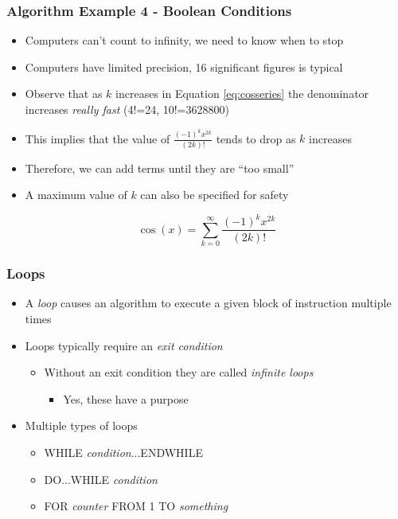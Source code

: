 \documentclass[14pt]{beamer}
\begin{document}
\begin{frame}
\frametitle{Algorithm Example 4 - Boolean Conditions}
{\small
\begin{itemize}
\setlength{\itemsep}{1pt}
  \setlength{\parskip}{0pt}
  \setlength{\parsep}{0pt}
	\item Computers can't count to infinity, we need to know when to stop
	\item Computers have limited precision, 16 significant figures is typical
	\item Observe that as $k$ increases in Equation \ref{eq:cosseries} the denominator increases \textit{really fast} (4!=24, 10!=3628800)
	\item This implies that the value of $\frac{(-1)^k x^{2k}}{(2k)!}$ tends to drop as $k$ increases
	\item Therefore, we can add terms until they are ``too small''
	\item A maximum value of $k$ can also be specified for safety 
\end{itemize}
\vspace{-3mm}
\begin{equation} \label{eq:cosseries}
\cos (x) = \sum_{k=0}^{\infty} \frac{(-1)^k x^{2k}}{(2k)!}
\end{equation}
}
\end{frame}

\begin{frame}
\frametitle{Loops}
\begin{itemize}
\item A \textit{loop} causes an algorithm to execute a given block of instruction multiple times
\item Loops typically require an \textit{exit condition}
	\begin{itemize}
		\item Without an exit condition they are called \textit{infinite loops}
		\begin{itemize}
			\item Yes, these have a purpose
		\end{itemize}
	\end{itemize}
\item Multiple types of loops
	\begin{itemize}
		\item WHILE \textit{condition}...ENDWHILE
		\item DO...WHILE \textit{condition}
		\item FOR \textit{counter} FROM 1 TO \textit{something}
	\end{itemize}
\end{itemize}
\end{frame}
\end{document}
